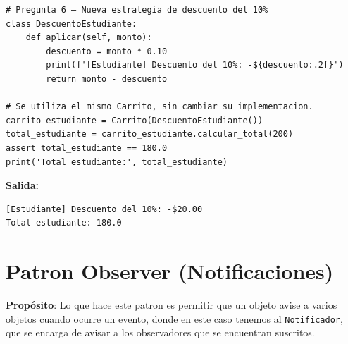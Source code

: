 \documentclass[letterpaper,11pt]{article}
\begin{document}
\begin{lstlisting}[style=pythonreport]
# Pregunta 6 – Nueva estrategia de descuento del 10%
class DescuentoEstudiante:
    def aplicar(self, monto):
        descuento = monto * 0.10
        print(f'[Estudiante] Descuento del 10%: -${descuento:.2f}')
        return monto - descuento

# Se utiliza el mismo Carrito, sin cambiar su implementacion.
carrito_estudiante = Carrito(DescuentoEstudiante())
total_estudiante = carrito_estudiante.calcular_total(200)
assert total_estudiante == 180.0
print('Total estudiante:', total_estudiante)
\end{lstlisting}
\par\noindent\textbf{Salida:}
\begin{lstlisting}[style=reportoutput,language={}]
[Estudiante] Descuento del 10%: -$20.00
Total estudiante: 180.0
\end{lstlisting}

\section{Patron Observer (Notificaciones)}


\textbf{Propósito}: Lo que hace este patron es permitir que un objeto avise a varios objetos cuando ocurre un evento, donde en este caso tenemos al \texttt{Notificador}, que se encarga de avisar a los observadores que se encuentran suscritos.
\end{document}
